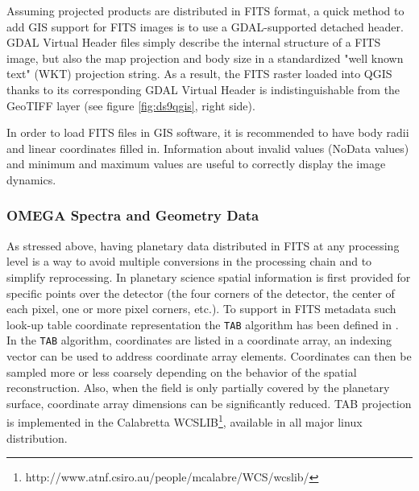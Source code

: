 Assuming projected products are distributed in FITS format, a quick method to add GIS
support for FITS images is to use a GDAL-supported detached header.
GDAL Virtual Header files simply describe the internal structure of a FITS image, but
also the map projection and body size in a standardized "well known text"
(WKT) projection string.
As a result, the FITS raster loaded into QGIS thanks to its corresponding GDAL Virtual
Header is indistinguishable from the GeoTIFF layer (see figure \ref{fig:ds9qgis},
right side).

In order to load FITS files in GIS software, it is recommended to have
body radii and linear coordinates filled in.
Information about invalid values (NoData values) and minimum and maximum values are
useful to correctly display the image dynamics.

\subsubsection{OMEGA Spectra and Geometry Data}
As stressed above, having planetary data distributed in FITS at any processing level is
a way to avoid multiple conversions in the processing chain and to simplify
reprocessing.
In planetary science spatial information is first provided for specific points over
the detector (the four corners of the detector, the center of each pixel,
one or more pixel corners, etc.).
To support in FITS metadata such look-up table coordinate representation the
\texttt{TAB} algorithm has been defined in \citet{wcsspectral}.
In the \texttt{TAB} algorithm, coordinates are listed in a coordinate array,
an indexing vector can be used to address coordinate array elements.
Coordinates can then be sampled more or less coarsely depending on the behavior of the
spatial reconstruction.
Also, when the field is only partially covered by the planetary surface, coordinate
array dimensions can be significantly reduced. 
TAB projection is implemented in the Calabretta WCSLIB\footnote{http://www.atnf.csiro.au/people/mcalabre/WCS/wcslib/},
available in all major linux distribution.

